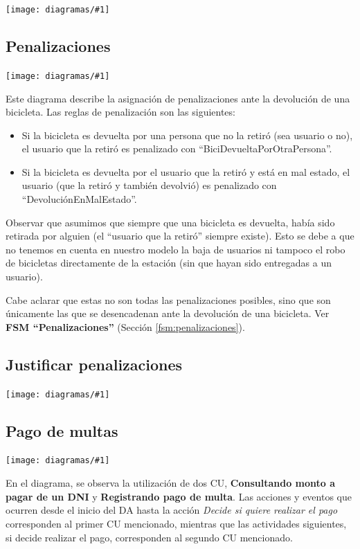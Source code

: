 \documentclass[a4paper, 10pt, twoside]{article}
\newcommand{\diagramav}[1]{%
  \texttt{[image: diagramas/\#1]}%
}
\newcommand{\diagramavtrim}[2]{%
  \texttt{[image: diagramas/\#1]}%
}
\begin{document}
\diagramav{da-devolucion-bicicleta}


\subsection{Penalizaciones} 
\label{sec:da-penalizaciones}

\diagramavtrim{da-penalizaciones}{4cm}

Este diagrama describe la asignación de penalizaciones ante la devolución de una bicicleta. Las reglas de penalización son las siguientes:

\begin{itemize}
  \item Si la bicicleta es devuelta por una persona que no la retiró (sea usuario o no), el usuario que la retiró es penalizado con ``BiciDevueltaPorOtraPersona''.

  \item Si la bicicleta es devuelta por el usuario que la retiró y está en mal estado, el usuario (que la retiró y también devolvió) es penalizado con ``DevoluciónEnMalEstado''.
\end{itemize}

Observar que asumimos que siempre que una bicicleta es devuelta, había sido retirada por alguien (el ``usuario que la retiró'' siempre existe). Esto se debe a que no tenemos en cuenta en nuestro modelo la baja de usuarios ni tampoco el robo de bicicletas directamente de la estación (sin que hayan sido entregadas a un usuario).

Cabe aclarar que estas no son todas las penalizaciones posibles, sino que son únicamente las que se desencadenan ante la devolución de una bicicleta. Ver {\bf FSM ``Penalizaciones''} (Sección \ref{fsm:penalizaciones}).


\subsection{Justificar penalizaciones}
\label{sec:da-justificar-penalizacion}

\diagramav{da-justificar-penalizacion}


\subsection{Pago de multas}
\label{sec:da-pago-de-multas}

\diagramavtrim{da-pago-de-multas}{5cm}

En el diagrama, se observa la utilización de dos CU, \textbf{Consultando monto a pagar de un DNI} y \textbf{Registrando pago de multa}. Las acciones y eventos que ocurren desde el inicio del DA hasta la acción \textit{Decide si quiere realizar el pago} corresponden al primer CU mencionado, mientras que las actividades siguientes, si decide realizar el pago, corresponden al segundo CU mencionado.
\end{document}

